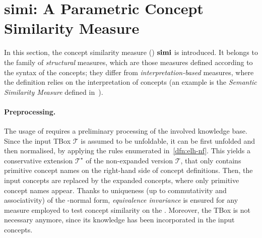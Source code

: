 \section{simi: A Parametric Concept Similarity Measure}
\label{sec:simi}

In this section, the concept similarity measure (\csm) \(\mathbf{simi}\) is introduced.
It belongs to the family of \emph{structural} measures, which are those measures defined according to the syntax of the concepts; they differ from \emph{interpretation-based} measures, where the definition relies on the interpretation of concepts (an example is the \emph{Semantic Similarity Measure} defined in~\cite{SemSim}).


\paragraph{Preprocessing.}
The usage of \simi requires a preliminary processing of the involved knowledge base.
Since the input TBox \(\mathcal{T}\) is assumed to be unfoldable, it can be first unfolded and then normalised, by applying the rules enumerated in~\cref{dfn:elh-nf}.
This yields a conservative extension \(\mathcal{T}^\star\) of the non-expanded version \(\mathcal{T}\), that only contains primitive concept names on the right-hand side of concept definitions.
Then, the input concepts are replaced by the expanded concepts, where only primitive concept names appear.
Thanks to uniqueness (up to commutativity and associativity) of the \elh-normal form, \emph{equivalence invariance} is ensured for any measure employed to test concept similarity on the \kb.
Moreover, the TBox is not necessary anymore, since its knowledge has been incorporated in the input concepts.

